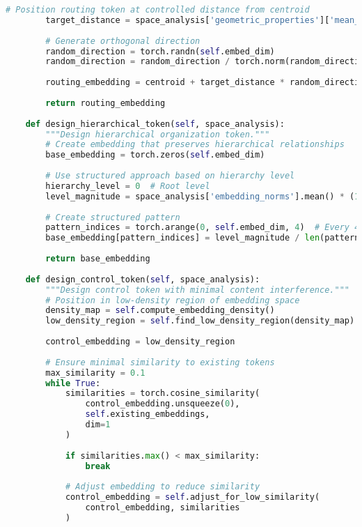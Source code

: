 \begin{lstlisting}[language=Python, caption=Embedding space analysis for custom token design]
        # Position routing token at controlled distance from centroid
        target_distance = space_analysis['geometric_properties']['mean_distance'] * 1.5
        
        # Generate orthogonal direction
        random_direction = torch.randn(self.embed_dim)
        random_direction = random_direction / torch.norm(random_direction)
        
        routing_embedding = centroid + target_distance * random_direction
        
        return routing_embedding
    
    def design_hierarchical_token(self, space_analysis):
        """Design hierarchical organization token."""
        # Create embedding that preserves hierarchical relationships
        base_embedding = torch.zeros(self.embed_dim)
        
        # Use structured approach based on hierarchy level
        hierarchy_level = 0  # Root level
        level_magnitude = space_analysis['embedding_norms'].mean() * (1.2 ** hierarchy_level)
        
        # Create structured pattern
        pattern_indices = torch.arange(0, self.embed_dim, 4)  # Every 4th dimension
        base_embedding[pattern_indices] = level_magnitude / len(pattern_indices)
        
        return base_embedding
    
    def design_control_token(self, space_analysis):
        """Design control token with minimal content interference."""
        # Position in low-density region of embedding space
        density_map = self.compute_embedding_density()
        low_density_region = self.find_low_density_region(density_map)
        
        control_embedding = low_density_region
        
        # Ensure minimal similarity to existing tokens
        max_similarity = 0.1
        while True:
            similarities = torch.cosine_similarity(
                control_embedding.unsqueeze(0),
                self.existing_embeddings,
                dim=1
            )
            
            if similarities.max() < max_similarity:
                break
                
            # Adjust embedding to reduce similarity
            control_embedding = self.adjust_for_low_similarity(
                control_embedding, similarities
            )
        

\end{lstlisting}
